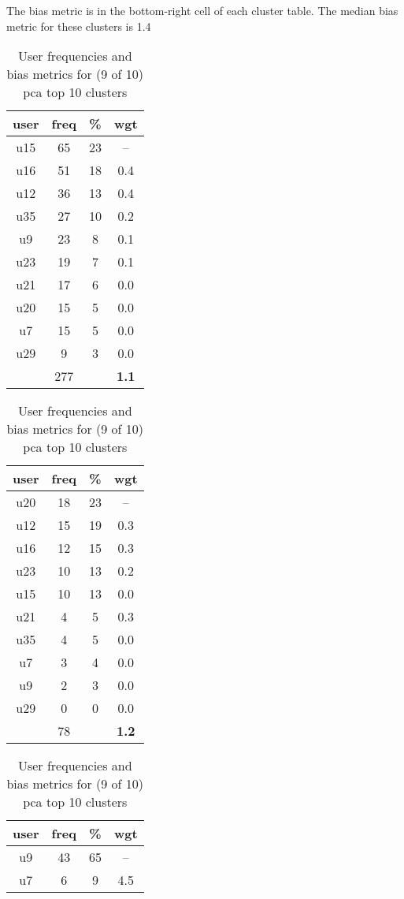 \begin{appendices}
\begin{table}
\centering
\caption{User frequencies and bias metrics for (9 of 10) pca top 10 clusters}
{\small The bias metric is in the bottom-right cell of each cluster table. The median bias metric for these clusters is 1.4 \\}
\bigskip
\begin{tabular}{ |c|c|c|c| }
	\hline
	\textbf{user} & \textbf{freq} & \textbf{\%} & \textbf{wgt} \\
	\hline
	u15 & 65 & 23 & -- \\
	u16 & 51 & 18 & 0.4 \\
	u12 & 36 & 13 & 0.4 \\
	u35 & 27 & 10 & 0.2 \\
	u9 & 23 & 8 & 0.1 \\
	u23 & 19 & 7 & 0.1 \\
	u21 & 17 & 6 & 0.0 \\
	u20 & 15 & 5 & 0.0 \\
	u7 & 15 & 5 & 0.0 \\
	u29 & 9 & 3 & 0.0 \\
	 & 277 & & \textbf{1.1} \\
	\hline
\end{tabular}
\begin{tabular}{ |c|c|c|c| }
	\hline
	\textbf{user} & \textbf{freq} & \textbf{\%} & \textbf{wgt} \\
	\hline
	u20 & 18 & 23 & -- \\
	u12 & 15 & 19 & 0.3 \\
	u16 & 12 & 15 & 0.3 \\
	u23 & 10 & 13 & 0.2 \\
	u15 & 10 & 13 & 0.0 \\
	u21 & 4 & 5 & 0.3 \\
	u35 & 4 & 5 & 0.0 \\
	u7 & 3 & 4 & 0.0 \\
	u9 & 2 & 3 & 0.0 \\
	u29 & 0 & 0 & 0.0 \\
	 & 78 & & \textbf{1.2} \\
	\hline
\end{tabular}
\begin{tabular}{ |c|c|c|c| }
	\hline
	\textbf{user} & \textbf{freq} & \textbf{\%} & \textbf{wgt} \\
	\hline
	u9 & 43 & 65 & -- \\
	u7 & 6 & 9 & 4.5 \\

\end{tabular}
\end{table}
\end{appendices}
